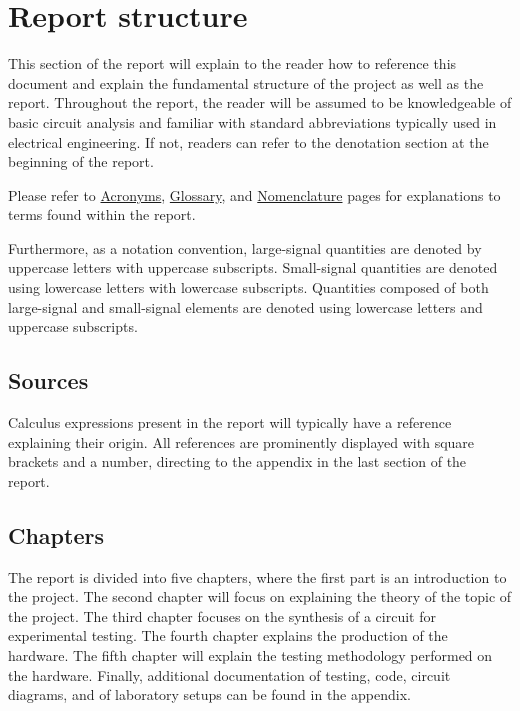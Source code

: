 \chapter*{Report structure} \label{cha:report_structure}
This section of the report will explain to the reader how to reference this document and explain the fundamental structure of the project as well as the report. Throughout the report, the reader will be assumed to be knowledgeable of basic circuit analysis and familiar with standard abbreviations typically used in electrical engineering. If not, readers can refer to the denotation section at the beginning of the report.

Please refer to \hyperref[cha:acronyms]{Acronyms}, \hyperref[cha:glossary]{Glossary}, and \hyperref[cha:nomenclature]{Nomenclature} pages for explanations to terms found within the report.

Furthermore, as a notation convention, large-signal  quantities are denoted by uppercase letters with uppercase subscripts. Small-signal quantities are denoted using lowercase letters with lowercase subscripts. Quantities composed of both large-signal and small-signal elements are denoted using lowercase letters and uppercase subscripts.

\section*{Sources}
Calculus expressions present in the report will typically have a reference explaining their origin. All references are prominently displayed with square brackets and a number, directing to the appendix in the last section of the report.

\section*{Chapters}
The report is divided into five chapters, where the first part is an introduction to the project. The second chapter will focus on explaining the theory of the topic of the project. The third chapter focuses on the synthesis of a circuit for experimental testing. The fourth chapter explains the production of the hardware. The fifth chapter will explain the testing methodology performed on the hardware. Finally, additional documentation of testing, code, circuit diagrams, and of laboratory setups can be found in the appendix.